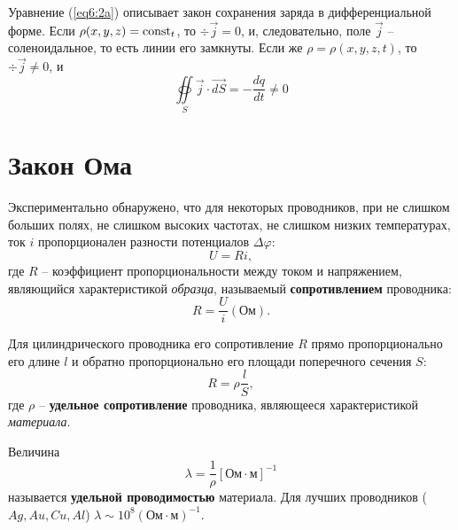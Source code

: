    Уравнение (\ref{eq6:2a}) описывает закон сохранения заряда в
    дифференциальной форме. Если \( \rho(x, y, z) = \mathrm{const}_t \), то
    \( \div\vec{j} = 0 \), и, следовательно, поле \( \vec{j} \) --
    соленоидальное, то есть линии его замкнуты. Если же
    \( \rho = \rho(x, y, z, t) \), то  \( \div\vec{j} \ne 0 \), и
    \[
        \oiint\limits_S \vec{j}\cdot\vec{dS} = -\frac{dq}{dt} \ne 0
    \]
    
\section{Закон Ома}

    Экспериментально обнаружено, что для некоторых проводников, при не слишком
    больших полях, не слишком высоких частотах, не слишком низких температурах,
    ток \( i \) пропорционален разности потенциалов \( \Delta \varphi \):
    \[
        U = Ri,
    \]
    где \( R \) -- коэффициент пропорциональности между током и напряжением,
    являющийся характеристикой \textit{образца}, называемый
    \textbf{сопротивлением} проводника:
    \begin{equation}
        R = \frac{U}{i} \left( \text{Ом} \right).
    \end{equation}
    
    Для цилиндрического проводника его сопротивление \( R \) прямо
    пропорционально его длине \( l \) и обратно пропорционально его площади
    поперечного сечения \( {S} \):
    \[
        R = \rho\frac{l}{S},
    \]
    где \( \rho \) -- \textbf{удельное сопротивление} проводника, являющееся
    характеристикой \textit{материала}.
    
    Величина 
    \[
        \lambda = \frac{1}{\rho} [\text{Ом}\cdot\text{м}]^{-1}
    \] 
    называется \textbf{удельной проводимостью} материала. Для лучших
    проводников (\( Ag, Au, Cu, Al \))
    \( \lambda \sim 10^8 (\text{Ом}\cdot\text{м})^{-1} \).
    
